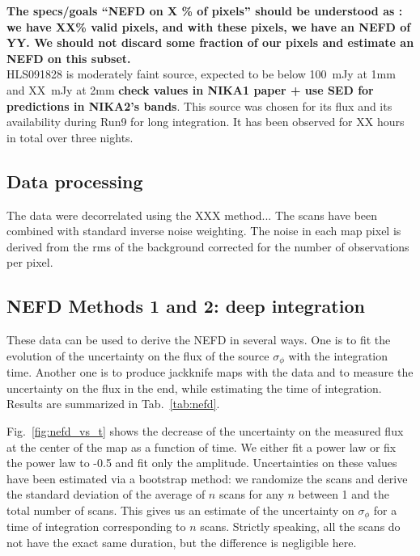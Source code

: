 \documentclass[a4paper, 11pt]{article} %
\begin{document}
{\bf The specs/goals ``NEFD on X \% of pixels'' should be understood as : we have
XX\% valid pixels, and with these pixels, we have an NEFD of YY. We should not
discard some fraction of our pixels and estimate an NEFD on this subset.}\\

HLS091828 is moderately faint source, expected to be below 100~mJy at 1mm and
XX~mJy at 2mm {\bf check values in NIKA1 paper + use SED for predictions in
  NIKA2's bands}. This source was chosen for its flux and its availability during
Run9 for long integration. It has been observed for XX hours in total over three
nights.

\subsection{Data processing}

The data were decorrelated using the XXX method... The scans have been combined
with standard inverse noise weighting. The noise in each map pixel is derived
from the rms of the background corrected for the number of observations per
pixel.

\subsection{NEFD Methods 1 and 2: deep integration}
These data can be used to derive the NEFD in several ways. One is to fit the
evolution of the uncertainty on the flux of the source $\sigma_\phi$ with the
integration time. Another one is to produce jackknife maps with the data and to
measure the uncertainty on the flux in the end, while estimating the time of
integration. Results are summarized in Tab.~\ref{tab:nefd}.

Fig.~\ref{fig:nefd_vs_t} shows the decrease of the uncertainty on the measured
flux at the center of the map as a function of time. We either fit a power law
or fix the power law to -0.5 and fit only the amplitude. Uncertainties on these
values have been estimated via a bootstrap method: we randomize the scans and
derive the standard deviation of the average of $n$ scans for any $n$ between 1
and the total number of scans. This gives us an estimate of the uncertainty on
$\sigma_\phi$ for a time of integration corresponding to $n$ scans. Strictly
speaking, all the scans do not have the exact same duration, but the difference
is negligible here.
\end{document}
